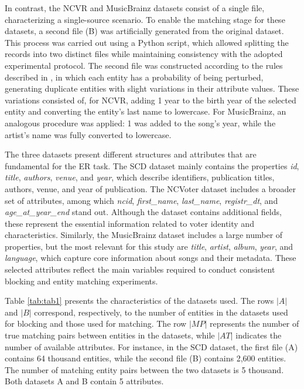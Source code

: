 \documentclass{ieeeaccess}
\begin{document}
In contrast, the NCVR and MusicBrainz datasets consist of a single file, characterizing a single-source scenario. To enable the matching stage for these datasets, a second file (B) was artificially generated from the original dataset. This process was carried out using a Python script, which allowed splitting the records into two distinct files while maintaining consistency with the adopted experimental protocol. The second file was constructed according to the rules described in \cite{karapiperis2023}, in which each entity has a probability of being perturbed, generating duplicate entities with slight variations in their attribute values. These variations consisted of, for NCVR, adding 1 year to the birth year of the selected entity and converting the entity's last name to lowercase. For MusicBrainz, an analogous procedure was applied: 1 was added to the song's year, while the artist's name was fully converted to lowercase.

The three datasets present different structures and attributes that are fundamental for the ER task. The SCD dataset mainly contains the properties \textit{id}, \textit{title}, \textit{authors}, \textit{venue}, and \textit{year}, which describe identifiers, publication titles, authors, venue, and year of publication. The NCVoter dataset includes a broader set of attributes, among which \textit{ncid}, \textit{first\_name}, \textit{last\_name}, \textit{registr\_dt}, and \textit{age\_at\_year\_end} stand out. Although the dataset contains additional fields, these represent the essential information related to voter identity and characteristics. Similarly, the MusicBrainz dataset includes a large number of properties, but the most relevant for this study are \textit{title}, \textit{artist}, \textit{album}, \textit{year}, and \textit{language}, which capture core information about songs and their metadata. These selected attributes reflect the main variables required to conduct consistent blocking and entity matching experiments.

Table \ref{tab:tab1} presents the characteristics of the datasets used. The rows $\lvert A \rvert$ and $\lvert B \rvert$ correspond, respectively, to the number of entities in the datasets used for blocking and those used for matching. The row $\lvert MP \rvert$ represents the number of true matching pairs between entities in the datasets, while $\lvert AT \rvert$ indicates the number of available attributes. For instance, in the SCD dataset, the first file (A) contains 64 thousand entities, while the second file (B) contains 2,600 entities. The number of matching entity pairs between the two datasets is 5 thousand. Both datasets A and B contain 5 attributes.
\end{document}
